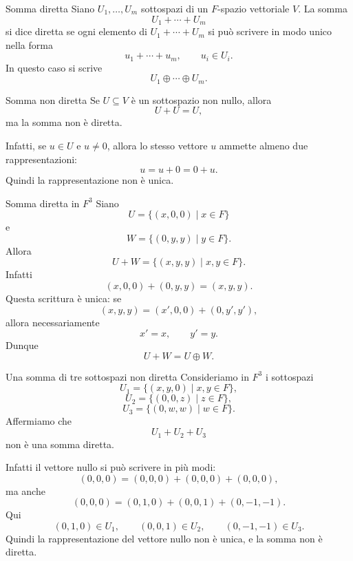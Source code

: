 \documentclass[a4paper]{article}
\begin{document}
\begin{snippetdefinition}{Somma diretta}
    Siano \(U_1,\ldots,U_m\) sottospazi di un \(F\)-spazio vettoriale \(V\). La somma
    \[
        U_1+\cdots+U_m
    \]
    si dice diretta se ogni elemento di \(U_1+\cdots+U_m\) si può scrivere in modo unico nella forma
    \[
        u_1+\cdots+u_m,
        \qquad
        u_i\in U_i.
    \]
    In questo caso si scrive
    \[
        U_1\oplus\cdots\oplus U_m.
    \]
\end{snippetdefinition}

\begin{snippetexample}{Somma non diretta}
    Se \(U\subseteq V\) è un sottospazio non nullo, allora
    \[
        U+U=U,
    \]
    ma la somma non è diretta.

    Infatti, se \(u\in U\) e \(u\neq 0\), allora lo stesso vettore \(u\) ammette almeno due rappresentazioni:
    \[
        u=u+0=0+u.
    \]
    Quindi la rappresentazione non è unica.
\end{snippetexample}

\begin{snippetexample}{Somma diretta in \(F^3\)}
    Siano
    \[
        U=\{(x,0,0)\mid x\in F\}
    \]
    e
    \[
        W=\{(0,y,y)\mid y\in F\}.
    \]
    Allora
    \[
        U+W=\{(x,y,y)\mid x,y\in F\}.
    \]
    Infatti
    \[
        (x,0,0)+(0,y,y)=(x,y,y).
    \]
    Questa scrittura è unica: se
    \[
        (x,y,y)=(x',0,0)+(0,y',y'),
    \]
    allora necessariamente
    \[
        x'=x,
        \qquad
        y'=y.
    \]
    Dunque
    \[
        U+W=U\oplus W.
    \]
\end{snippetexample}

\begin{snippetexample}{Una somma di tre sottospazi non diretta}
    Consideriamo in \(F^3\) i sottospazi
    \[
        U_1=\{(x,y,0)\mid x,y\in F\},
    \]
    \[
        U_2=\{(0,0,z)\mid z\in F\},
    \]
    \[
        U_3=\{(0,w,w)\mid w\in F\}.
    \]
    Affermiamo che
    \[
        U_1+U_2+U_3
    \]
    non è una somma diretta.

    Infatti il vettore nullo si può scrivere in più modi:
    \[
        (0,0,0)
        =
        (0,0,0)+(0,0,0)+(0,0,0),
    \]
    ma anche
    \[
        (0,0,0)
        =
        (0,1,0)+(0,0,1)+(0,-1,-1).
    \]
    Qui
    \[
        (0,1,0)\in U_1,
        \qquad
        (0,0,1)\in U_2,
        \qquad
        (0,-1,-1)\in U_3.
    \]
    Quindi la rappresentazione del vettore nullo non è unica, e la somma non è diretta.
\end{snippetexample}
\end{document}
